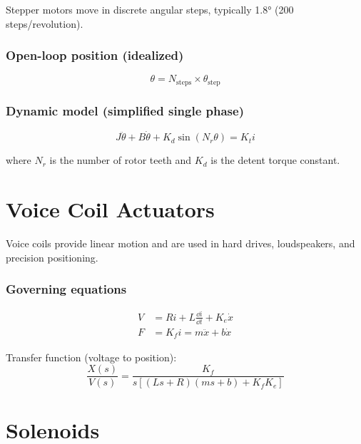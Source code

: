 Stepper motors move in discrete angular steps, typically 1.8° (200 steps/revolution).

\subsubsection{Open-loop position (idealized)}
\begin{equation}
\theta = N_{\text{steps}} \times \theta_{\text{step}}
\end{equation}

\subsubsection{Dynamic model (simplified single phase)}
\begin{equation}
J\ddot{\theta} + B\dot{\theta} + K_d\sin(N_r\theta) = K_t i
\end{equation}

where $N_r$ is the number of rotor teeth and $K_d$ is the detent torque constant.

\section{Voice Coil Actuators}
\label{sec:voice_coil}

Voice coils provide linear motion and are used in hard drives, loudspeakers, and precision positioning.



\subsubsection{Governing equations}
\begin{align}
V &= Ri + L\frac{\dd i}{\dd t} + K_e\dot{x} \\
F &= K_f i = m\ddot{x} + b\dot{x}
\end{align}

Transfer function (voltage to position):
\begin{equation}
\frac{X(s)}{V(s)} = \frac{K_f}{s[(Ls + R)(ms + b) + K_f K_e]}
\end{equation}

\section{Solenoids}
\label{sec:solenoids}

